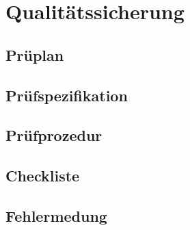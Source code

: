 \chapter{Qualitätssicherung}
\section{Prüplan}
\section{Prüfspezifikation}
\section{Prüfprozedur}
\section{Checkliste}
\section{Fehlermedung}
